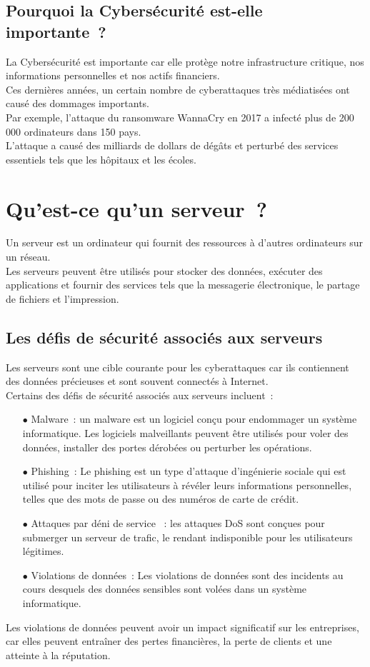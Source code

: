 \subsection{Pourquoi la Cybersécurité est-elle importante ?}   
La Cybersécurité est importante car elle protège notre infrastructure critique, nos informations personnelles et nos actifs financiers.\\
 Ces dernières années, un certain nombre de cyberattaques très médiatisées ont causé des dommages importants.\\
 Par exemple, l'attaque du ransomware WannaCry en 2017 a infecté plus de 200 000 ordinateurs dans 150 pays.\\ L'attaque a causé des milliards de dollars de dégâts et perturbé des services essentiels tels que les hôpitaux et les écoles.\\
 \section{Qu'est-ce qu'un serveur ? }
Un serveur est un ordinateur qui fournit des ressources à d'autres ordinateurs sur un réseau. \\Les serveurs peuvent être utilisés pour stocker des données, exécuter des applications et fournir des services tels que la messagerie électronique, le partage de fichiers et l'impression.
\subsection{Les défis de sécurité associés aux serveurs}
Les serveurs sont une cible courante pour les cyberattaques car ils contiennent des données précieuses et sont souvent connectés à Internet.\\ Certains des défis de sécurité associés aux serveurs incluent :\\
\begin{itemize}
 \item [$\bullet$] Malware : un malware est un logiciel conçu pour endommager un système informatique. Les logiciels malveillants peuvent être utilisés pour voler des données, installer des portes dérobées ou perturber les opérations.
\item [$\bullet$] Phishing :  Le phishing est un type d'attaque d'ingénierie sociale qui est utilisé pour inciter les utilisateurs à révéler leurs informations personnelles, telles que des mots de passe ou des numéros de carte de crédit.
\item [$\bullet$] Attaques par déni de service  :  les attaques DoS sont conçues pour submerger un serveur de trafic, le rendant indisponible pour les utilisateurs légitimes.
\item [$\bullet$] Violations de données :  Les violations de données sont des incidents au cours desquels des données sensibles sont volées dans un système informatique.
\end{itemize}
 Les violations de données peuvent avoir un impact significatif sur les entreprises, car elles peuvent entraîner des pertes financières, la perte de clients et une atteinte à la réputation.
